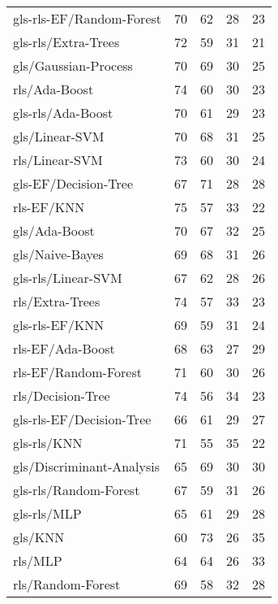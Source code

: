 \begin{longtable}{lrrrr}
    gls-rls-EF/Random-Forest         &  70 &  62 &  28 &  23 \\
    gls-rls/Extra-Trees              &  72 &  59 &  31 &  21 \\
    gls/Gaussian-Process             &  70 &  69 &  30 &  25 \\
    rls/Ada-Boost                    &  74 &  60 &  30 &  23 \\
    gls-rls/Ada-Boost                &  70 &  61 &  29 &  23 \\
    gls/Linear-SVM                   &  70 &  68 &  31 &  25 \\
    rls/Linear-SVM                   &  73 &  60 &  30 &  24 \\
    gls-EF/Decision-Tree             &  67 &  71 &  28 &  28 \\
    rls-EF/KNN                       &  75 &  57 &  33 &  22 \\
    gls/Ada-Boost                    &  70 &  67 &  32 &  25 \\
    gls/Naive-Bayes                  &  69 &  68 &  31 &  26 \\
    gls-rls/Linear-SVM               &  67 &  62 &  28 &  26 \\
    rls/Extra-Trees                  &  74 &  57 &  33 &  23 \\
    gls-rls-EF/KNN                   &  69 &  59 &  31 &  24 \\
    rls-EF/Ada-Boost                 &  68 &  63 &  27 &  29 \\
    rls-EF/Random-Forest             &  71 &  60 &  30 &  26 \\
    rls/Decision-Tree                &  74 &  56 &  34 &  23 \\
    gls-rls-EF/Decision-Tree         &  66 &  61 &  29 &  27 \\
    gls-rls/KNN                      &  71 &  55 &  35 &  22 \\
    gls/Discriminant-Analysis        &  65 &  69 &  30 &  30 \\
    gls-rls/Random-Forest            &  67 &  59 &  31 &  26 \\
    gls-rls/MLP                      &  65 &  61 &  29 &  28 \\
    gls/KNN                          &  60 &  73 &  26 &  35 \\
    rls/MLP                          &  64 &  64 &  26 &  33 \\
    rls/Random-Forest                &  69 &  58 &  32 &  28 \\

\end{longtable}
